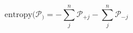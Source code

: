 \begin{equation}
\text{entropy}(\mathcal P_) = -\sum_j^n\mathcal P_{+j} -\sum_j^n\mathcal P_{-j}
\end{equation}